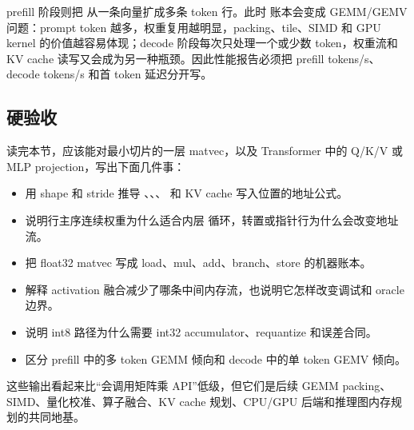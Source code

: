 prefill 阶段则把  从一条向量扩成多条 token 行。此时  账本会变成 GEMM/GEMV 问题：prompt token 越多，权重复用越明显，packing、tile、SIMD 和 GPU kernel 的价值越容易体现；decode 阶段每次只处理一个或少数 token，权重流和 KV cache 读写又会成为另一种瓶颈。因此性能报告必须把 prefill tokens/s、decode tokens/s 和首 token 延迟分开写。

\subsection{硬验收}

读完本节，应该能对最小切片的一层 matvec，以及 Transformer 中的 Q/K/V 或 MLP projection，写出下面几件事：

\begin{itemize}
  \item 用 shape 和 stride 推导 、、、 和 KV cache 写入位置的地址公式。
  \item 说明行主序连续权重为什么适合内层  循环，转置或指针行为什么会改变地址流。
  \item 把 float32 matvec 写成 load、mul、add、branch、store 的机器账本。
  \item 解释 activation 融合减少了哪条中间内存流，也说明它怎样改变调试和 oracle 边界。
  \item 说明 int8 路径为什么需要 int32 accumulator、requantize 和误差合同。
  \item 区分 prefill 中的多 token GEMM 倾向和 decode 中的单 token GEMV 倾向。
\end{itemize}

这些输出看起来比“会调用矩阵乘 API”低级，但它们是后续 GEMM packing、SIMD、量化校准、算子融合、KV cache 规划、CPU/GPU 后端和推理图内存规划的共同地基。
